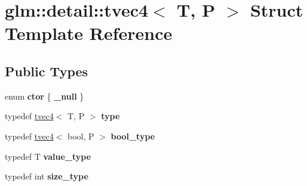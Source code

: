 \hypertarget{structglm_1_1detail_1_1tvec4}{}\section{glm\+:\+:detail\+:\+:tvec4$<$ T, P $>$ Struct Template Reference}
\label{structglm_1_1detail_1_1tvec4}
\subsection*{Public Types}
\begin{DoxyCompactItemize}
\item 
enum {\bfseries ctor} \{ {\bfseries \+\_\+null}
 \}\hypertarget{structglm_1_1detail_1_1tvec4_a931ed25f812335023097a513240ae102}{}\label{structglm_1_1detail_1_1tvec4_a931ed25f812335023097a513240ae102}

\item 
typedef \hyperlink{structglm_1_1detail_1_1tvec4}{tvec4}$<$ T, P $>$ {\bfseries type}\hypertarget{structglm_1_1detail_1_1tvec4_a6f73aac80b830832bddd293627bd79b1}{}\label{structglm_1_1detail_1_1tvec4_a6f73aac80b830832bddd293627bd79b1}

\item 
typedef \hyperlink{structglm_1_1detail_1_1tvec4}{tvec4}$<$ bool, P $>$ {\bfseries bool\+\_\+type}\hypertarget{structglm_1_1detail_1_1tvec4_ae066d27ec9adb11c25f37abe9b3a4161}{}\label{structglm_1_1detail_1_1tvec4_ae066d27ec9adb11c25f37abe9b3a4161}

\item 
typedef T {\bfseries value\+\_\+type}\hypertarget{structglm_1_1detail_1_1tvec4_a9fefebb21a1ed7cdabd61fc4f0b8e28e}{}\label{structglm_1_1detail_1_1tvec4_a9fefebb21a1ed7cdabd61fc4f0b8e28e}

\item 
typedef int {\bfseries size\+\_\+type}\hypertarget{structglm_1_1detail_1_1tvec4_a92061c78c7801c2cedb6c1bae68d1fd4}{}\label{structglm_1_1detail_1_1tvec4_a92061c78c7801c2cedb6c1bae68d1fd4}

\end{DoxyCompactItemize}
